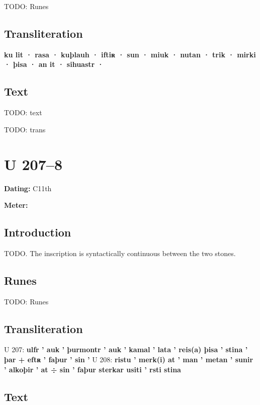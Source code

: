 TODO: Runes%

\subsection{Transliteration}

\textbf{ku lit · rasa · kuþlauh · iftiʀ · sun · miuk · nutan · trik · mirki · þisa · an it · sihuastr ·}

\subsection{Text}

\bpg\bpa[0]%
TODO: text\epa

\bpb TODO: trans\epb\epg

\sectionline\clearpage


\section{U 207--8}

\begin{flushright}%
\textbf{Dating:} C11th

\textbf{Meter:} \Fornyrdislag
\end{flushright}%

\subsection{Introduction}

TODO.  The inscription is syntactically continuous between the two stones.

\subsection{Runes}

TODO: Runes%

\subsection{Transliteration}

U 207: \textbf{ulfr ’ auk ’ þurmontr ’ auk ’ kamal ’ lata ’ reis(a) þisa ’ stina ’ þar + eftʀ ’ faþur ’ sin ’}
U 208: \textbf{ristu ’ merk(i) at ’ man ’ metan ’ sunir ’ alkoþir ’ at ÷ sin ’ faþur sterkar usiti ’ rsti stina}

\subsection{Text}

